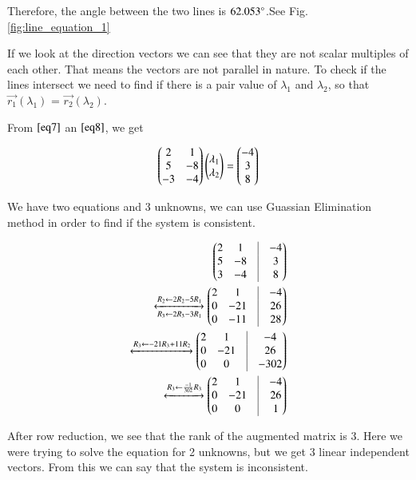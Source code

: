 \documentclass[journal,12pt,twocolumn]{IEEEtran}
\begin{document}
\begin{enumerate}
Therefore, the angle between the two lines is $62.053\degree$.See Fig. \ref{fig:line_equation_1}


If we look at the direction vectors we can see that they are not scalar multiples of each other. That means the vectors are not parallel in nature. To check if the lines intersect we need to find if there is a pair value of $\lambda_1$ and $\lambda_2$, so that $\vec{r_1}(\lambda_1)$ = $\vec{r_2}(\lambda_2)$.

From $\ref{eq7}$ an $\ref{eq8}$, we get

\begin{align}\label{eq11}
	\begin{pmatrix}
		2 & 1 \\
		5 & -8 \\
		-3 & -4  
	\end{pmatrix}
	\begin{pmatrix}
		\lambda_1 \\
		\lambda_2 
	\end{pmatrix}
	=
	\begin{pmatrix}
		-4 \\ 3 \\ 8
	\end{pmatrix}
\end{align}

We have two equations and 3 unknowns, we can use Guassian Elimination method in order to find if the system is consistent.

\begin{align}
	\myvec{
		2 & 1 & \vrule & -4 \\
		5 & -8 & \vrule & 3 \\
		3 & -4 & \vrule & 8 \\
	}
	\\
	\xleftrightarrow[R_3 \leftarrow 2R_3-3R_1]{R_2 \leftarrow 2R_2-5R_1}
	\myvec{
		2 & 1 & \vrule & -4 \\
		0 & -21 & \vrule & 26 \\
		0 & -11 & \vrule & 28 \\
	}
	\\
	\xleftrightarrow[]{R_3 \leftarrow -21R_3+11R_2}
	\myvec{
		2 & 1 & \vrule & -4 \\
		0 & -21 & \vrule & 26 \\
		0 & 0 & \vrule & -302 \\
	}
	\\
	\xleftrightarrow[]{R_3 \leftarrow \frac{-1}{302}R_3}
	\myvec{
		2 & 1 & \vrule & -4 \\
		0 & -21 & \vrule & 26 \\
		0 & 0 & \vrule & 1 \\
	}
\end{align}

After row reduction, we see that the rank of the augmented matrix is 3. Here we were trying to solve the equation for 2 unknowns, but we get 3 linear independent vectors. From this we can say that the system is inconsistent.



\end{enumerate}
\end{document}
